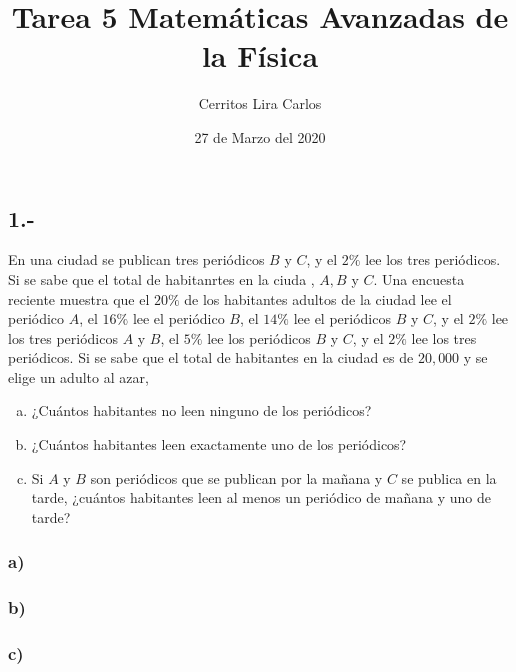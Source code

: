\documentclass{article}
\title{Tarea 5 Matemáticas Avanzadas de la Física}
\author{Cerritos Lira Carlos}
\date{27 de Marzo del 2020}
\begin{document}
\maketitle
\subsection*{1.-}
En una ciudad se publican tres periódicos $B$ y $C$, y el $2\%$ lee los tres periódicos. Si se sabe que el total de habitanrtes en la ciuda , $A,B$ y $C$. Una encuesta reciente muestra que el 
$20\%$ de los habitantes adultos de la ciudad lee el periódico $A$, el $16\%$ lee el periódico $B$, 
el $14\%$ lee el periódicos $B$ y $C$, y el $2 \%$ lee los tres periódicos $A$ y $B$, el $5\%$ lee los 
periódicos $B$ y $C$, y el $2\%$ lee los tres periódicos. Si se sabe que el total de habitantes en la ciudad es de 
$20,000$ y se elige un adulto al azar,
\begin{enumerate}[a)]
    \item ¿Cuántos habitantes no leen ninguno de los periódicos?
    \item ¿Cuántos habitantes leen exactamente uno de los periódicos?
    \item Si $A$ y $B$ son periódicos que se publican por la mañana y $C$ se publica en la tarde, 
    ¿cuántos habitantes leen al menos un periódico de mañana y uno de tarde?
\end{enumerate}
\begin{tcolorbox}[breakable]
    \subsubsection*{a)}
    
    \subsubsection*{b)}

    \subsubsection*{c)}
\end{tcolorbox}
\end{document}
